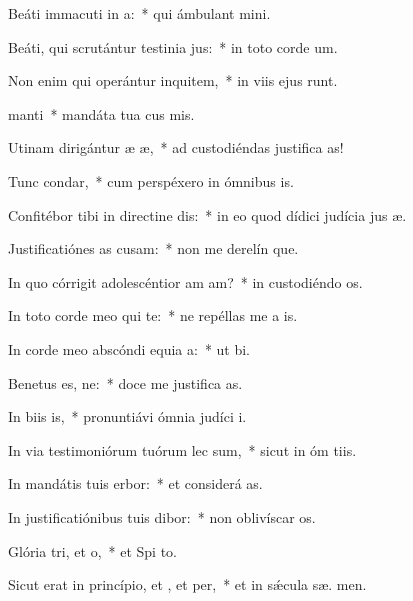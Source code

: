 \item Beáti immacuti in a:~* qui ámbulant   mini.
\item Beáti, qui scrutántur testinia jus:~* in toto corde  um.
\item Non enim qui operántur inquitem,~* in viis ejus runt.
\item {} manti~* mandáta tua cus mis.
\item Utinam dirigántur æ æ,~* ad custodiéndas justifica as!
\item Tunc  condar,~* cum perspéxero in ómnibus  is.
\item Confitébor tibi in directine dis:~* in eo quod dídici judícia jus æ.
\item Justificatiónes as cusam:~* non me derelín que.
\item In quo córrigit adolescéntior am am?~* in custodiéndo  os.
\item In toto corde meo qui te:~* ne repéllas me a  is.
\item In corde meo abscóndi equia a:~* ut   bi.
\item Benetus es, ne:~* doce me justifica as.
\item In biis is,~* pronuntiávi ómnia judíci  i.
\item In via testimoniórum tuórum lec sum,~* sicut in óm tiis.
\item In mandátis tuis erbor:~* et considerá  as.
\item In justificatiónibus tuis dibor:~* non oblivíscar  os.
\item Glória tri, et o,~* et Spi to.
\item Sicut erat in princípio, et , et per,~* et in sǽcula sæ. men.

